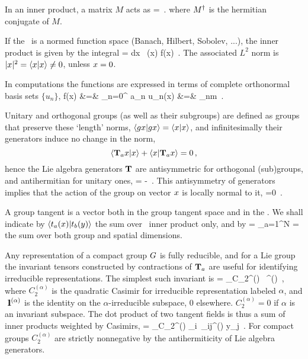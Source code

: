 {In an inner product, a matrix $M$ acts as
\beq
{} =
\,.
where $\dual{M}$ is the hermitian conjugate of $M$.

If the \statesp\ is a normed function space (Banach, Hilbert, Sobolev, ...),
the inner product is given by the integral
\beq
{} = \int dx \, (x) f(x)
\,.
The associated $L^2$ norm is
$|\ssp|^2 = \dotProd{\ssp}{\ssp} \neq 0$, unless $\ssp = 0$.

In computations the functions are expressed in terms of
complete orthonormal basis sets $\{u_n\}$,
\bea
f(x) &=& \sum_{n=0}^{\infty} a_n u_n(x)
    \continue
{} &=& \delta_{nm}
\,.
\label{basisL2}
\eea

Unitary and orthogonal groups (as well as their subgroups) are
defined as groups that preserve these `length' norms,
$\left\langle {\ensuremath{g}x}|{g x} \right\rangle =  \left\langle {x}|{x} \right\rangle$, and
infinitesimally their generators induce no change in the norm,
\[
\left\langle { \ensuremath{\mathbf{T}}_a\ensuremath{x}}|{x} \right\rangle
  +\left\langle {\ensuremath{x}}|{\mathbf{T}_ax} \right\rangle =0
\,,
\]
hence the Lie algebra generators
$\mathbf{T}$ are antisymmetric for orthogonal (sub)groups,
and antihermitian for unitary ones,
\beq
\dual{\Lg} = - \Lg
\,.
This antisymmetry of generators
implies that the action of the group on vector $x$ is
locally normal to it,
\beq
{} =0
\,.

A group tangent  is a vector both in the group
tangent space and in the \statesp.
We shall indicate by $\left\langle {\ensuremath{t}_{a}(x)}|{t_{b}(y)} \right\rangle$  the sum over \statesp\ inner product only, and by
\beq
{} =
    \sum_{a=1}^N  =
the sum over both group and spatial dimensions.

Any representation of a compact group $G$ is fully
reducible, and for a Lie group
the invariant tensors constructed by contractions
of $\mathbf{T}_a$ are useful for identifying irreducible
representations. The simplest such invariant is
\beq
\dual{\Lg} \cdot \Lg = \sum_\alpha C_2^{(\alpha)} \, \id^{(\alpha)}
\,,
where $C_2^{(\alpha)}$ is the quadratic Casimir for
irreducible representation labeled $\alpha$, and
${\ \hbox{{\rm 1}\kern-.6em\hbox{\rm 1}}}^{(\alpha)}$ is the identity on the $\alpha$-irreducible
subspace, 0 elsewhere. $ C_2^{(\alpha)} =0$ if $\alpha$
is an invariant subspace.
The dot product of two tangent fields
 is thus a sum of inner products
weighted by Casimirs,
\beq
{}
   = \sum_\alpha C_2^{(\alpha)} _i\, \delta_{ij}^{(\alpha)} y_j
\,.
For compact groups $C_2^{(\alpha)}$ are strictly nonnegative by
the antihermiticity  of Lie algebra generators.

}
